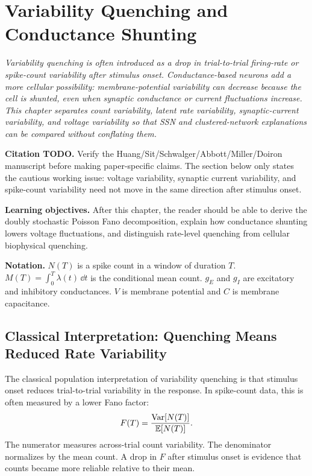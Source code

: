 \chapter{Variability Quenching and Conductance Shunting}
\label{ch:variability-quenching-conductance-shunting}

\textit{Variability quenching is often introduced as a drop in trial-to-trial firing-rate or spike-count variability after stimulus onset. Conductance-based neurons add a more cellular possibility: membrane-potential variability can decrease because the cell is shunted, even when synaptic conductance or current fluctuations increase. This chapter separates count variability, latent rate variability, synaptic-current variability, and voltage variability so that SSN and clustered-network explanations can be compared without conflating them.}

\noindent\textbf{Citation TODO.} Verify the Huang/Sit/Schwalger/Abbott/Miller/Doiron manuscript before making paper-specific claims. The section below only states the cautious working issue: voltage variability, synaptic current variability, and spike-count variability need not move in the same direction after stimulus onset.

\noindent\textbf{Learning objectives.} After this chapter, the reader should be able to derive the doubly stochastic Poisson Fano decomposition, explain how conductance shunting lowers voltage fluctuations, and distinguish rate-level quenching from cellular biophysical quenching.

\noindent\textbf{Notation.} $N(T)$ is a spike count in a window of duration $T$. $M(T)=\int_0^T \lambda(t)\,\dd t$ is the conditional mean count. $g_E$ and $g_I$ are excitatory and inhibitory conductances. $V$ is membrane potential and $C$ is membrane capacitance.

\section{Classical Interpretation: Quenching Means Reduced Rate Variability}
\label{sec:classical-quenching-reduced-rate-variability}

The classical population interpretation of variability quenching is that stimulus onset reduces trial-to-trial variability in the response. In spike-count data, this is often measured by a lower Fano factor:
%
\begin{equation}
  F(T)
  =
  \frac{\operatorname{Var}[N(T)]}{\mathbb{E}[N(T)]}.
  \label{eq:ch17-fano}
\end{equation}
%
The numerator measures across-trial count variability. The denominator normalizes by the mean count. A drop in $F$ after stimulus onset is evidence that counts became more reliable relative to their mean.

